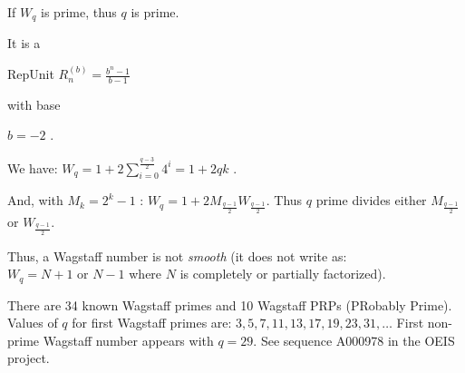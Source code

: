 \documentclass[latin1]{quadrature}
\newif\ifenfrancais
\begin{document}
\begin{article}
\begin{article}
 \vspace{.05in}
 \ifenfrancais
 
$W_q$ premier implique : $q$ premier.
\else
If $W_q$ is prime, thus $q$ is prime.
\fi

\vspace{.03in}

\ifenfrancais
C'est aussi un 
\else
It is a
\fi
 RepUnit $R_n^{(b)} = \frac{\displaystyle b^n-1}{\displaystyle b-1}$
 \ifenfrancais
 avec 
\else
  with base
\fi
 $b=-2$ .

\vspace{.03in}


\ifenfrancais
Nous avons: $W_q = 1+2 \displaystyle \sum_{i=0}^{\frac{q-3}{2}}4^i = 1 + 2qk $ .


Et, avec $M_k=2^k-1$ : $W_q = 1+2 \displaystyle  M_{\frac{q-1}{2}} W_{\frac{q-1}{2}}$.

Ainsi, si $q$ est premier, il divise soit $M_{\frac{q-1}{2}}$ soit $W_{\frac{q-1}{2}}$.
\else
We have: $W_q = 1+2 \displaystyle \sum_{i=0}^{\frac{q-3}{2}}4^i = 1 + 2qk $ .


And, with $M_k=2^k-1$ : $W_q = 1+2 \displaystyle  M_{\frac{q-1}{2}} W_{\frac{q-1}{2}}$. Thus $q$ prime divides either $M_{\frac{q-1}{2}}$ or $W_{\frac{q-1}{2}}$.
\fi

\vspace{.1in}

\ifenfrancais
Donc, un nombre de Wagstaff n'est pas \emph{smooth} (il ne s'\'ecrit pas sous la forme : $W_q=N\pm1$ o\`u $N$ est enti\`erement ou partiellement factoris\'e).
\else
Thus, a Wagstaff number is not \emph{smooth} (it does not write as: $W_q=N+1 \text{ or } N-1$ where $N$ is completely or partially factorized).
\fi


\vspace{.1in}

\ifenfrancais
Il existe 34 nombres de Wagstaff premiers connus et 10 PRPs (Probably Prime) de Wagstaff.
Les premi\`eres valeurs de $q$ donnant un nombre de Wagstaff premier sont : $3, 5, 7, 11, 13, 17, 19, 23, 31, \dots$ Le premier Wagstaff non-premier appara\^t avec $q=29$.
Voir la s\'equence A000978 du projet OEIS.
\else
There are 34 known Wagstaff primes and 10 Wagstaff PRPs (PRobably Prime).
Values of $q$ for first Wagstaff primes are: $3, 5, 7, 11, 13, 17, 19, 23, 31, \dots$  First non-prime Wagstaff number appears with $q=29$.
See sequence A000978 in the OEIS project.
\fi


\end{article}
\end{article}
\end{document}
